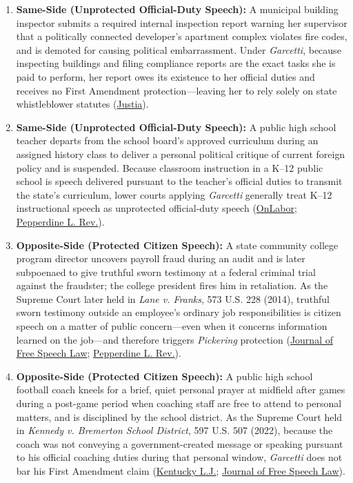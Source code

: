 \documentclass[12pt]{article}
\begin{document}
\begin{enumerate}
  \item \textbf{Same-Side (Unprotected Official-Duty Speech):} A municipal building inspector submits a required internal inspection report warning her supervisor that a politically connected developer's apartment complex violates fire codes, and is demoted for causing political embarrassment. Under \textit{Garcetti}, because inspecting buildings and filing compliance reports are the exact tasks she is paid to perform, her report owes its existence to her official duties and receives no First Amendment protection---leaving her to rely solely on state whistleblower statutes (\href{https://supreme.justia.com/cases/federal/us/547/410/}{Justia}).
  \item \textbf{Same-Side (Unprotected Official-Duty Speech):} A public high school teacher departs from the school board's approved curriculum during an assigned history class to deliver a personal political critique of current foreign policy and is suspended. Because classroom instruction in a K--12 public school is speech delivered pursuant to the teacher's official duties to transmit the state's curriculum, lower courts applying \textit{Garcetti} generally treat K--12 instructional speech as unprotected official-duty speech (\href{https://onlabor.org/garcettis-impact-on-teachers/}{OnLabor}; \href{https://digitalcommons.pepperdine.edu/cgi/viewcontent.cgi?article=2685&context=plr}{Pepperdine L. Rev.}).
  \item \textbf{Opposite-Side (Protected Citizen Speech):} A state community college program director uncovers payroll fraud during an audit and is later subpoenaed to give truthful sworn testimony at a federal criminal trial against the fraudster; the college president fires him in retaliation. As the Supreme Court later held in \textit{Lane v. Franks}, 573 U.S. 228 (2014), truthful sworn testimony outside an employee's ordinary job responsibilities is citizen speech on a matter of public concern---even when it concerns information learned on the job---and therefore triggers \textit{Pickering} protection (\href{https://www.journaloffreespeechlaw.org/kozel.pdf}{Journal of Free Speech Law}; \href{https://digitalcommons.pepperdine.edu/cgi/viewcontent.cgi?article=2685&context=plr}{Pepperdine L. Rev.}).
  \item \textbf{Opposite-Side (Protected Citizen Speech):} A public high school football coach kneels for a brief, quiet personal prayer at midfield after games during a post-game period when coaching staff are free to attend to personal matters, and is disciplined by the school district. As the Supreme Court held in \textit{Kennedy v. Bremerton School District}, 597 U.S. 507 (2022), because the coach was not conveying a government-created message or speaking pursuant to his official coaching duties during that personal window, \textit{Garcetti} does not bar his First Amendment claim (\href{https://uknowledge.uky.edu/cgi/viewcontent.cgi?article=5590&context=klj}{Kentucky L.J.}; \href{https://www.journaloffreespeechlaw.org/kozel.pdf}{Journal of Free Speech Law}).

\end{enumerate}
\end{document}
